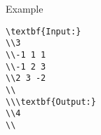 Example
\begin{verbatim}
\textbf{Input:}
\\3
\\-1 1 1
\\-1 2 3
\\2 3 -2
\\
\\\textbf{Output:}
\\4
\\\end{verbatim}